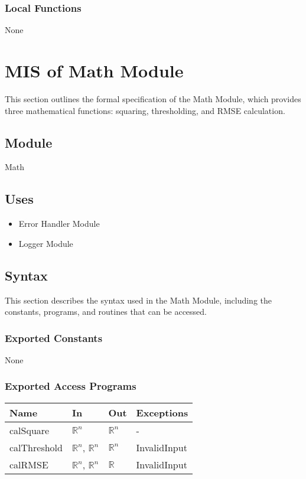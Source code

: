 \documentclass[12pt, titlepage]{article}
\begin{document}
\subsubsection{Local Functions}

None

\newpage

\section{MIS of Math Module} \label{MIS_Math}

This section outlines the formal specification of the Math Module, which
provides three mathematical functions: squaring, thresholding, and RMSE
calculation.

\subsection{Module}

Math

\subsection{Uses}

\begin{itemize}
\item Error Handler Module
\item Logger Module
\end{itemize}

\subsection{Syntax}

This section describes the syntax used in the Math Module, including the
constants, programs, and routines that can be accessed.

\subsubsection{Exported Constants}

None

\subsubsection{Exported Access Programs}

\begin{center}
\begin{tabular}{p{2cm} p{4cm} p{4cm} p{2cm}}
\hline
\textbf{Name} & \textbf{In} & \textbf{Out} & \textbf{Exceptions} \\
\hline
calSquare & $\mathbb{R}^n$ & $\mathbb{R}^n$ & - \\
calThreshold & $\mathbb{R}^n$, $\mathbb{R}^n$ & $\mathbb{R}^n$ & InvalidInput \\
calRMSE & $\mathbb{R}^n$, $\mathbb{R}^n$ & $\mathbb{R}$ & InvalidInput \\
\hline
\end{tabular}
\end{center}
\end{document}
